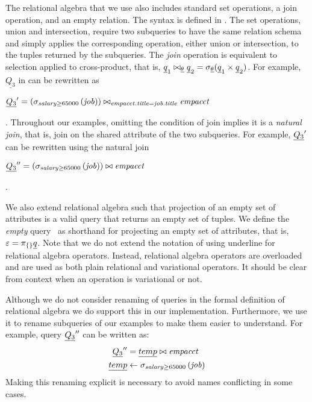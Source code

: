 The relational algebra that we use also includes standard set operations, a join 
operation, and an empty relation. The syntax is defined in .
%
The set operations, union and intersection, require two subqueries to have the same relation schema
and simply applies the corresponding operation, either union or intersection, to the tuples returned by
the subqueries.
%
The \emph{join} operation is equivalent to selection applied to cross-product, that is,
$\pQ_1 \bowtie_{\pCond} \pQ_2 = \vSel [\pCond] {(\pQ_1 \times \pQ_2)}$.
For example, $\underline{Q_3}$ in  can be rewritten as\\
\centerline{
\ensuremath{
\VVal {\underline{Q_3}} = \left(\sigma_{\salary \ge 65000} \left(\job\right)\right) \bowtie_{\empacct.\titleatt=\job.\titleatt} \empacct
}}.
\noindent
Throughout our examples, omitting the condition of join  implies it is a \emph{natural join},
that is, join on the shared attribute of the two subqueries.
For example, $\underline{Q_3}'$ can be rewritten using the natural join\\
\centerline{
\ensuremath{
\VVVal {\underline{Q_3}} =  \left(\sigma_{\salary \ge 65000} \left(\job\right)\right) \bowtie \empacct
}}.



We also extend relational algebra such that projection of an empty set of
attributes is a valid query that returns an empty set of tuples. We define the
\emph{empty} query \empPRel\ as shorthand for projecting an empty set of
attributes, that is, $\empPRel = \pi_{\{\}} \pQ$.
%
Note that we do not extend the notation of using underline for relational algebra
operators. Instead, relational algebra operators are overloaded and are used
as both plain relational and variational operators. It should be clear from
context when an operation is variational or not. 


Although we do not consider renaming of queries in the formal definition of 
relational algebra we do support this in our implementation. Furthermore, we use it
to rename subqueries of our examples to make them easier to understand. 
For example, query $\underline{Q_3}''$ can be written as:
\begin{align*}
\VVVal {\underline{Q_3}} &= \underline{temp} \bowtie \empacct\\
\underline{temp} &\leftarrow  \sigma_{\salary \ge 65000} \left(\job\right)
\end{align*}
\noindent
Making this renaming explicit is necessary to avoid names conflicting in some cases.




